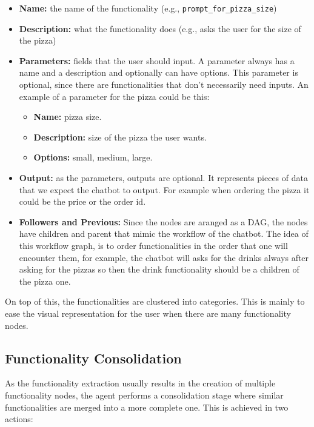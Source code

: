 \begin{itemize}
  \item \textbf{Name:} the name of the functionality (e.g., \texttt{prompt\_for\_pizza\_size})
  \item \textbf{Description:} what the functionality does (e.g., asks the user for the size of the pizza)
  \item \textbf{Parameters:} fields that the user should input.
    A parameter always has a name and a description
    and optionally can have options.
    This parameter is optional,
    since there are functionalities that don't necessarily need inputs.
    An example of a parameter for the pizza could be this:
    \begin{itemize}
      \item \textbf{Name:} pizza size.
      \item \textbf{Description:} size of the pizza the user wants.
      \item \textbf{Options:} small, medium, large.
    \end{itemize}
  \item \textbf{Output:} as the parameters, outputs are optional.
    It represents pieces of data that we expect the chatbot to output.
    For example when ordering the pizza it could be the price or the order id.
  \item \textbf{Followers and Previous:}
    Since the nodes are aranged as a \ac{DAG},
    the nodes have children and parent
    that mimic the workflow of the chatbot.
    The idea of this workflow graph,
    is to order functionalities in the order that one will encounter them,
    for example, the chatbot will asks for the drinks always after asking for the pizzas
    so then the drink functionality should be a children of the pizza one.
\end{itemize}

On top of this,
the functionalities are clustered into categories.
This is mainly to ease the visual representation for the user
when there are many functionality nodes.

\subsection{Functionality Consolidation}\label{subsec:functionality-consolidation}


As the functionality extraction usually results
in the creation of multiple functionality nodes,
the agent performs a consolidation stage where
similar functionalities are merged into a more complete one.
This is achieved in two actions:

